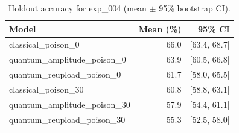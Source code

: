 \begin{table}[ht]
\centering
\caption{Holdout accuracy for exp_004 (mean $\pm$ 95\% bootstrap CI).}
\label{tab:exp_004}
\begin{tabular}{lrr}
\toprule
Model & Mean (\%) & 95\% CI \\
\midrule
classical\_poison\_0 & 66.0 & [63.4, 68.7] \\
quantum\_amplitude\_poison\_0 & 63.9 & [60.5, 66.8] \\
quantum\_reupload\_poison\_0 & 61.7 & [58.0, 65.5] \\
classical\_poison\_30 & 60.8 & [58.8, 63.1] \\
quantum\_amplitude\_poison\_30 & 57.9 & [54.4, 61.1] \\
quantum\_reupload\_poison\_30 & 55.3 & [52.5, 58.0] \\
\bottomrule
\end{tabular}
\end{table}

